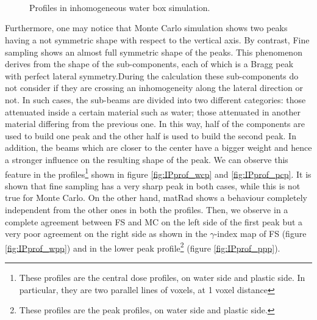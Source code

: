 \documentclass[12pt, a4paper, twoside]{book}
\begin{document}
\begin{figure}[]
\centering
{} 
\\
\\
\\
\caption{Profiles in inhomogeneous water box simulation.}
\label{fig:IPprof}
\end{figure}

Furthermore, one may notice that Monte Carlo simulation shows two peaks having a not symmetric shape with respect to the vertical axis. By contrast, Fine sampling shows an almost full symmetric shape of the peaks. This phenomenon derives from the shape of the sub-components, each of which is a Bragg peak with perfect lateral symmetry.During the calculation these sub-components do not consider if they are crossing an inhomogeneity along the lateral direction or not. 
In such cases, the sub-beams are divided into two different categories: those attenuated inside a certain material such as water; those attenuated in another material differing from the previous one.
In this way, half of the components are used to build one peak and the other half is used to build the second peak. In addition, the beams which are closer to the center have a bigger weight and hence a stronger influence on the resulting shape of the peak. We can observe this feature in the profiles\footnote{These profiles are the central dose profiles, on water side and plastic side. In particular, they are two parallel lines of voxels, at 1 voxel distance} shown in figure \ref{fig:IPprof_wcp} and \ref{fig:IPprof_pcp}. It is shown that fine sampling has a very sharp peak in both cases, while this is not true for Monte Carlo. On the other hand, matRad shows a behaviour completely independent from the other ones in both the profiles.
Then, we observe in a complete agreement between FS and MC on the left side of the first peak but a very poor agreement on the right side as shown in the $\gamma$-index map of FS (figure \ref{fig:IPprof_wpp}) and in the lower peak profile\footnote{These profiles are the peak profiles, on water side and plastic side.} (figure \ref{fig:IPprof_ppp}).
\end{document}
